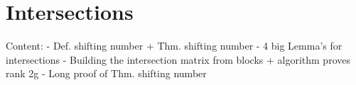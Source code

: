 \documentclass[main.tex]{subfiles}
\begin{document}
  \section{Intersections}

  Content: - Def. shifting number + Thm. shifting number
	   - 4 big Lemma's for intersections
	   - Building the intersection matrix from blocks + algorithm proves rank 2g
	   - Long proof of Thm. shifting number
  
\end{document}
